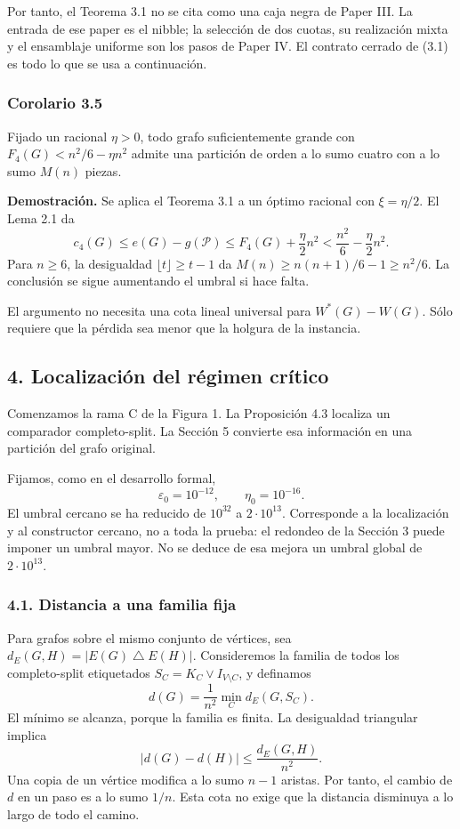 \documentclass[spanish,11pt,a4paper]{article}
\begin{document}
Por tanto, el Teorema 3.1 no se cita como una caja negra de Paper III. La entrada de ese paper es el nibble; la selección de dos cuotas, su realización mixta y el ensamblaje uniforme son los pasos de Paper IV. El contrato cerrado de (3.1) es todo lo que se usa a continuación.

\subsubsection{Corolario 3.5}\label{corolario-3.5}

Fijado un racional \(\eta>0\), todo grafo suficientemente grande con \(F_4(G)<n^2/6-\eta n^2\) admite una partición de orden a lo sumo cuatro con a lo sumo \(M(n)\) piezas.

\textbf{Demostración.} Se aplica el Teorema 3.1 a un óptimo racional con \(\xi=\eta/2\). El Lema 2.1 da \[
c_4(G)\le e(G)-g(\mathcal P)
\le F_4(G)+\frac\eta2n^2
<\frac{n^2}{6}-\frac\eta2n^2.
\] Para \(n\ge6\), la desigualdad \(\lfloor t\rfloor\ge t-1\) da \(M(n)\ge n(n+1)/6-1\ge n^2/6\). La conclusión se sigue aumentando el umbral si hace falta.

El argumento no necesita una cota lineal universal para \(W^*(G)-W(G)\). Sólo requiere que la pérdida sea menor que la holgura de la instancia.

\subsection{4. Localización del régimen crítico}\label{localizaciuxf3n-del-ruxe9gimen-cruxedtico}

Comenzamos la rama C de la Figura 1. La Proposición 4.3 localiza un comparador completo-split. La Sección 5 convierte esa información en una partición del grafo original.

Fijamos, como en el desarrollo formal, \[
\varepsilon_0=10^{-12},\qquad \eta_0=10^{-16}.
\tag{4.1}
\] El umbral cercano se ha reducido de \(10^{32}\) a \(2\cdot10^{13}\). Corresponde a la localización y al constructor cercano, no a toda la prueba: el redondeo de la Sección 3 puede imponer un umbral mayor. No se deduce de esa mejora un umbral global de \(2\cdot10^{13}\).

\subsubsection{4.1. Distancia a una familia fija}\label{distancia-a-una-familia-fija}

Para grafos sobre el mismo conjunto de vértices, sea \(d_E(G,H)=|E(G)\mathbin{\triangle}E(H)|\). Consideremos la familia de todos los completo-split etiquetados \(S_C=K_C\vee I_{V\setminus C}\), y definamos \[
d(G)=\frac1{n^2}\min_C d_E(G,S_C).
\] El mínimo se alcanza, porque la familia es finita. La desigualdad triangular implica \[
|d(G)-d(H)|\le\frac{d_E(G,H)}{n^2}.
\tag{4.2}
\] Una copia de un vértice modifica a lo sumo \(n-1\) aristas. Por tanto, el cambio de \(d\) en un paso es a lo sumo \(1/n\). Esta cota no exige que la distancia disminuya a lo largo de todo el camino.
\end{document}
